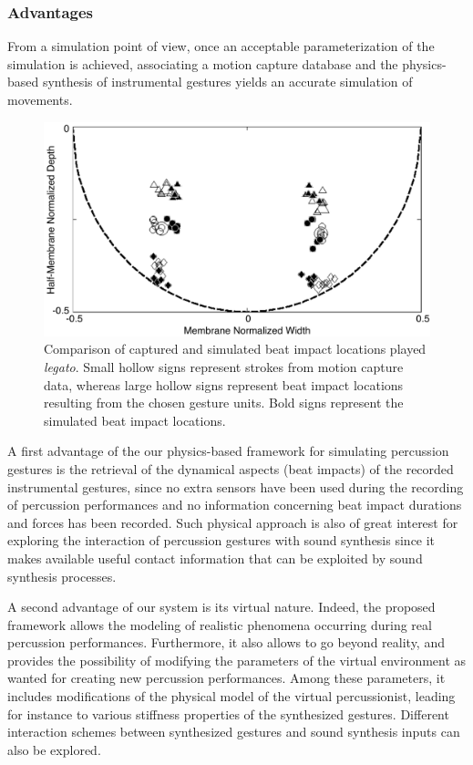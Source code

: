 			\subsubsection{Advantages}
			\label{subsubsec:AL_IGS_A}

From a simulation point of view, once an acceptable parameterization of the simulation is achieved, associating a motion capture database and the physics-based synthesis of instrumental gestures yields an accurate simulation of movements.

\begin{figure}%
	\begin{center}
		\includegraphics[width=0.8\columnwidth]{Chapters/6/Pics/Pdf/beatImpactsAnalysis2.pdf}
	\end{center}
	\vspace{-0.5cm}
	\caption[Comparison of captured and simulated beat impact locations played \emph{legato}]{Comparison of captured and simulated beat impact locations played \emph{legato}. Small hollow signs represent strokes from motion capture data, whereas large hollow signs represent beat impact locations resulting from the chosen gesture units. Bold signs represent the simulated beat impact locations.}
	\label{fig:variability}
\end{figure}
	
A first advantage of the our physics-based framework for simulating percussion gestures is the retrieval of the dynamical aspects (beat impacts) of the recorded instrumental gestures, since no extra sensors have been used during the recording of percussion performances and no information concerning beat impact durations and forces has been recorded. Such physical approach is also of great interest for exploring the interaction of percussion gestures with sound synthesis since it makes available useful contact information that can be exploited by sound synthesis processes.

A second advantage of our system is its virtual nature. Indeed, the proposed framework allows the modeling of realistic phenomena occurring during real percussion performances. Furthermore, it also allows to go beyond reality, and provides the possibility of modifying the parameters of the virtual environment as wanted for creating new percussion performances. Among these parameters, it includes modifications of the physical model of the virtual percussionist, leading for instance to various stiffness properties of the synthesized gestures. Different interaction schemes between synthesized gestures and sound synthesis inputs can also be explored.\\

